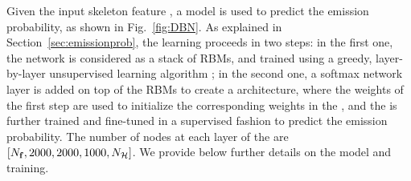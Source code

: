 
Given the input skeleton feature \skfeature, a \DBN model is used to predict the emission probability, as shown in Fig.~\ref{fig:DBN}.
As explained in Section~\ref{sec:emissionprob}, the learning proceeds in two steps:
in the first one, the network is considered as a stack of RBMs, and trained using a greedy, layer-by-layer
unsupervised learning algorithm \cite{hinton2006fast};
in the second one, a softmax network layer is added on top of the RBMs to create a \DBN architecture,
where the  weights of the first step are used to initialize the corresponding weights in the \DBN,
and the \DBN is further trained and fine-tuned in a supervised fashion to predict the emission probability.
%
The number of nodes at each layer of the \DBN are $[N_{\mathbf{f}},2000,2000,1000,N_{\mathcal{H}}]$.
We provide below further details on the model and training.

